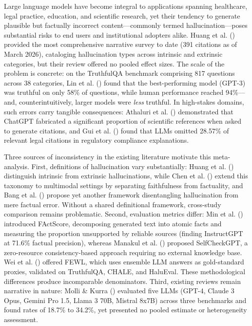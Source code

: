 \documentclass[
  11pt,
  a4paper,
]{article}
\begin{document}
Large language models have become integral to applications spanning
healthcare, legal practice, education, and scientific research, yet
their tendency to generate plausible but factually incorrect
content---commonly termed hallucination---poses substantial risks to end
users and institutional adopters alike. Huang et al.
() provided the most comprehensive
narrative survey to date (391 citations as of March 2026), cataloging
hallucination types across intrinsic and extrinsic categories, but their
review offered no pooled effect sizes. The scale of the problem is
concrete: on the TruthfulQA benchmark comprising 817 questions across 38
categories, Lin et al. () found that the
best-performing model (GPT-3) was truthful on only 58\% of questions,
while human performance reached 94\%---and, counterintuitively, larger
models were \emph{less} truthful. In high-stakes domains, such errors
carry tangible consequences: Athaluri et al.
() demonstrated that ChatGPT fabricated
a significant proportion of scientific references when asked to generate
citations, and Gui et al. () found that LLMs
omitted 28.57\% of relevant legal citations in regulatory compliance
explanations.

Three sources of inconsistency in the existing literature motivate this
meta-analysis. First, definitions of hallucination vary substantially:
Huang et al. () distinguish intrinsic from
extrinsic hallucinations, while Chen et al.
() extend this taxonomy to multimodal
settings by separating faithfulness from factuality, and Bang et al.
() propose yet another framework
disentangling hallucination from mere factual error. Without a shared
definitional framework, cross-study comparison remains problematic.
Second, evaluation metrics differ: Min et al.
() introduced FActScore, decomposing
generated text into atomic facts and measuring the proportion
unsupported by reliable sources (finding InstructGPT at 71.6\% factual
precision), whereas Manakul et al. ()
proposed SelfCheckGPT, a zero-resource consistency-based approach
requiring no external knowledge base. Wei et al.
() offered FEWL, which uses ensemble LLM
answers as gold-standard proxies, validated on TruthfulQA, CHALE, and
HaluEval. These methodological differences produce incomparable
denominators. Third, existing reviews remain narrative in nature: Molli
\& Kurra () evaluated five LLMs (GPT-4,
Claude 3 Opus, Gemini Pro 1.5, Llama 3 70B, Mistral 8x7B) across three
benchmarks and found rates of 18.7\% to 34.2\%, yet presented no pooled
estimate or heterogeneity assessment.
\end{document}
